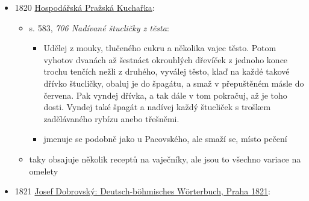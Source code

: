 \begin{itemize}
  \begin{itemize}
  \tightlist
  \item
  \item
    s. 223  na Bohmische Kuchlein, plát těsta na rožni:

    \begin{itemize}
    \tightlist
    \item
      Udělá se těsto z mléka, mouky a vajec, vmíchá se do něj trochu
      kvásku a droždí, nechá se těsto trochu vykynout, propracuje se,
      aby zhoustlo, vyválí se do šířky, posype se hrozinkami, skořicí a
      muškátovým květem (mace). Vezme se k tomu určený rožeň, potře se
      sádlem, těsto se na něj obtočí a opéká se. A protože je (těsto)
      ještě měkké, přikryje se papírem, aby (koláček) z rožně nespadl.
    \end{itemize}
  \end{itemize}
\item
  1820
  \href{https://kramerius5.nkp.cz/uuid/uuid:17fecb00-8844-11dc-a7a5-000d606f5dc6}{Hospodářská
  Pražská Kuchařka}:

  \begin{itemize}
  \tightlist
  \item
    s. 583,  \emph{706 Nadívané štucličky z těsta}:

    \begin{itemize}
    \tightlist
    \item
      Udělej z mouky, tlučeného cukru a několika vajec těsto. Potom
      vyhotov dvanách až šestnáct okrouhlých dřevíček z jednoho konce
      trochu tenčích nežli z druhého, vyválej těsto, klaď na každé
      takové dřívko štucličky, obaluj je do špagátu, a smaž v
      přepuštěném másle do červena. Pak vyndej dřívka, a tak dále v tom
      pokračuj, až je toho dosti. Vyndej také špagát a nadívej každý
      štucliček s troškem zadělávaného rybízu anebo třešněmi.
    \item
      jmenuje se podobně jako u Pacovského, ale smaží se, místo pečení
    \end{itemize}
  \item
    taky obsajuje několik receptů na vaječníky, ale jsou to všechno
    variace na omelety
  \end{itemize}
\item
  1821
  \href{https://bara.ujc.cas.cz/slovniky/dobrovsky/dobrovsky587.html}{Josef
  Dobrovský: Deutsch-böhmisches Wörterbuch, Praha 1821}:


\end{itemize}
